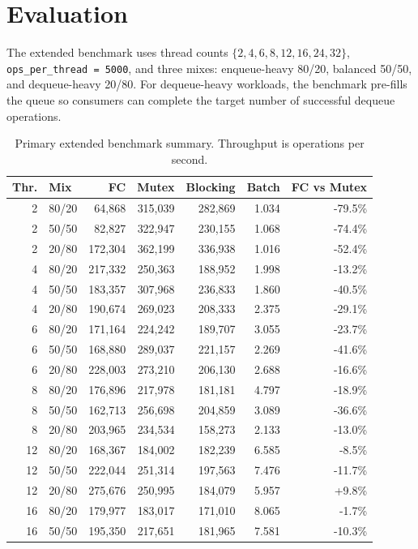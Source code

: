 \documentclass[11pt,a4paper]{article}
\begin{document}
\section{Evaluation}
The extended benchmark uses thread counts \(\{2,4,6,8,12,16,24,32\}\), \texttt{ops\_per\_thread = 5000}, and three mixes: enqueue-heavy 80/20, balanced 50/50, and dequeue-heavy 20/80. For dequeue-heavy workloads, the benchmark pre-fills the queue so consumers can complete the target number of successful dequeue operations.

\begin{table}[htbp]
\centering
\scriptsize
\caption{Primary extended benchmark summary. Throughput is operations per second.}
\label{tab:primary}
\begin{tabular}{@{}r l r r r r r@{}}
\toprule
Thr. & Mix & FC & Mutex & Blocking & Batch & FC vs Mutex \\
\midrule
2  & 80/20 & 64,868 & 315,039 & 282,869 & 1.034 & -79.5\% \\
2  & 50/50 & 82,827 & 322,947 & 230,155 & 1.068 & -74.4\% \\
2  & 20/80 & 172,304 & 362,199 & 336,938 & 1.016 & -52.4\% \\
4  & 80/20 & 217,332 & 250,363 & 188,952 & 1.998 & -13.2\% \\
4  & 50/50 & 183,357 & 307,968 & 236,833 & 1.860 & -40.5\% \\
4  & 20/80 & 190,674 & 269,023 & 208,333 & 2.375 & -29.1\% \\
6  & 80/20 & 171,164 & 224,242 & 189,707 & 3.055 & -23.7\% \\
6  & 50/50 & 168,880 & 289,037 & 221,157 & 2.269 & -41.6\% \\
6  & 20/80 & 228,003 & 273,210 & 206,130 & 2.688 & -16.6\% \\
8  & 80/20 & 176,896 & 217,978 & 181,181 & 4.797 & -18.9\% \\
8  & 50/50 & 162,713 & 256,698 & 204,859 & 3.089 & -36.6\% \\
8  & 20/80 & 203,965 & 234,534 & 158,273 & 2.133 & -13.0\% \\
12 & 80/20 & 168,367 & 184,002 & 182,239 & 6.585 & -8.5\% \\
12 & 50/50 & 222,044 & 251,314 & 197,563 & 7.476 & -11.7\% \\
12 & 20/80 & 275,676 & 250,995 & 184,079 & 5.957 & +9.8\% \\
16 & 80/20 & 179,977 & 183,017 & 171,010 & 8.065 & -1.7\% \\
16 & 50/50 & 195,350 & 217,651 & 181,965 & 7.581 & -10.3\% \\

\end{tabular}
\end{table}
\end{document}
